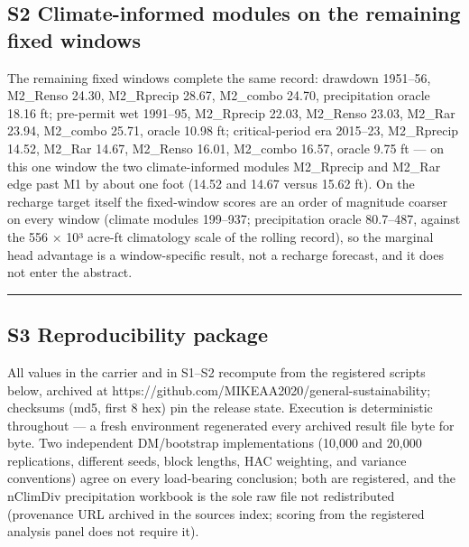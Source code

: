 \documentclass[11pt]{article}
\begin{document}
\subsection{S2 Climate-informed modules on the remaining fixed
windows}\label{s2-climate-informed-modules-on-the-remaining-fixed-windows}

The remaining fixed windows complete the same record: drawdown 1951--56,
M2\_Renso 24.30, M2\_Rprecip 28.67, M2\_combo 24.70, precipitation
oracle 18.16 ft; pre-permit wet 1991--95, M2\_Rprecip 22.03, M2\_Renso
23.03, M2\_Rar 23.94, M2\_combo 25.71, oracle 10.98 ft; critical-period
era 2015--23, M2\_Rprecip 14.52, M2\_Rar 14.67, M2\_Renso 16.01,
M2\_combo 16.57, oracle 9.75 ft --- on this one window the two
climate-informed modules M2\_Rprecip and M2\_Rar edge past M1 by about
one foot (14.52 and 14.67 versus 15.62 ft). On the recharge target
itself the fixed-window scores are an order of magnitude coarser on
every window (climate modules 199--937; precipitation oracle 80.7--487,
against the 556 × 10³ acre-ft climatology scale of the rolling record),
so the marginal head advantage is a window-specific result, not a
recharge forecast, and it does not enter the abstract.

\begin{center}\rule{0.5\linewidth}{0.5pt}\end{center}

\subsection{S3 Reproducibility
package}\label{s3-reproducibility-package}

All values in the carrier and in S1--S2 recompute from the registered
scripts below, archived at
https://github.com/MIKEAA2020/general-sustainability; checksums (md5,
first 8 hex) pin the release state. Execution is deterministic
throughout --- a fresh environment regenerated every archived result
file byte for byte. Two independent DM/bootstrap implementations (10,000
and 20,000 replications, different seeds, block lengths, HAC weighting,
and variance conventions) agree on every load-bearing conclusion; both
are registered, and the nClimDiv precipitation workbook is the sole raw
file not redistributed (provenance URL archived in the sources index;
scoring from the registered analysis panel does not require it).
\end{document}
